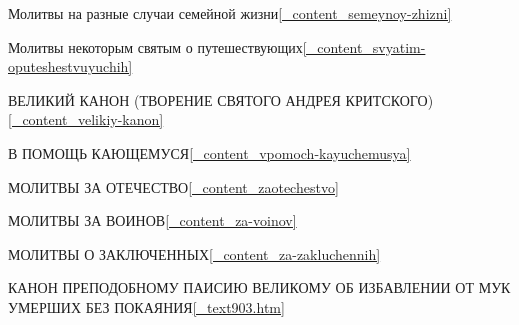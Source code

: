 \medskip

\Large Молитвы на разные случаи семейной жизни\hfill\ref{_content_semeynoy-zhizni}

\medskip

\Large Молитвы некоторым святым о путешествующих\hfill\ref{_content_svyatim-oputeshestvuyuchih}

\medskip

\Large ВЕЛИКИЙ КАНОН (ТВОРЕНИЕ СВЯТОГО АНДРЕЯ КРИТСКОГО)\hfill\ref{_content_velikiy-kanon}

\medskip

\Large В ПОМОЩЬ КАЮЩЕМУСЯ\hfill\ref{_content_vpomoch-kayuchemusya}

\medskip

\Large МОЛИТВЫ ЗА ОТЕЧЕСТВО\hfill\ref{_content_zaotechestvo}

\medskip

\Large МОЛИТВЫ ЗА ВОИНОВ\hfill\ref{_content_za-voinov}

\medskip

\Large МОЛИТВЫ О ЗАКЛЮЧЕННЫХ\hfill\ref{_content_za-zakluchennih}

\medskip

\Large КАНОН ПРЕПОДОБНОМУ ПАИСИЮ ВЕЛИКОМУ ОБ ИЗБАВЛЕНИИ ОТ МУК УМЕРШИХ БЕЗ ПОКАЯНИЯ\hfill\ref{_text903.htm}

\medskip

